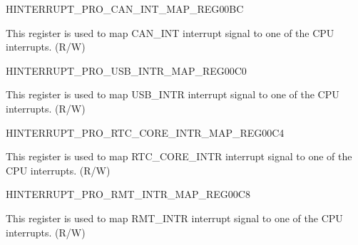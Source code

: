 \begin{register}{H}{INTERRUPT\_PRO\_CAN\_INT\_MAP\_REG}{\hexprefix{}00BC}\label{regdesc:INTERRUPTPROCANINTMAPREG}
%
%
\regnewline%
\begin{regdesc}\begin{reglist}
\label{fielddesc:INTERRUPTPROCANINTMAP}\item [INTERRUPT\_PRO\_CAN\_INT\_MAP] This register is used to map CAN\_INT interrupt signal to one of the CPU interrupts. (R/W)
\end{reglist}\end{regdesc}
\end{register}


\begin{register}{H}{INTERRUPT\_PRO\_USB\_INTR\_MAP\_REG}{\hexprefix{}00C0}\label{regdesc:INTERRUPTPROUSBINTRMAPREG}
%
%
\regnewline%
\begin{regdesc}\begin{reglist}
\label{fielddesc:INTERRUPTPROUSBINTRMAP}\item [INTERRUPT\_PRO\_USB\_INTR\_MAP] This register is used to map USB\_INTR interrupt signal to one of the CPU interrupts. (R/W)
\end{reglist}\end{regdesc}
\end{register}


\begin{register}{H}{INTERRUPT\_PRO\_RTC\_CORE\_INTR\_MAP\_REG}{\hexprefix{}00C4}\label{regdesc:INTERRUPTPRORTCCOREINTRMAPREG}
%
%
\regnewline%
\begin{regdesc}\begin{reglist}
\label{fielddesc:INTERRUPTPRORTCCOREINTRMAP}\item [INTERRUPT\_PRO\_RTC\_CORE\_INTR\_MAP] This register is used to map RTC\_CORE\_INTR interrupt signal to one of the CPU interrupts. (R/W)
\end{reglist}\end{regdesc}
\end{register}


\begin{register}{H}{INTERRUPT\_PRO\_RMT\_INTR\_MAP\_REG}{\hexprefix{}00C8}\label{regdesc:INTERRUPTPRORMTINTRMAPREG}
%
%
\regnewline%
\begin{regdesc}\begin{reglist}
\label{fielddesc:INTERRUPTPRORMTINTRMAP}\item [INTERRUPT\_PRO\_RMT\_INTR\_MAP] This register is used to map RMT\_INTR interrupt signal to one of the CPU interrupts. (R/W)
\end{reglist}\end{regdesc}
\end{register}


